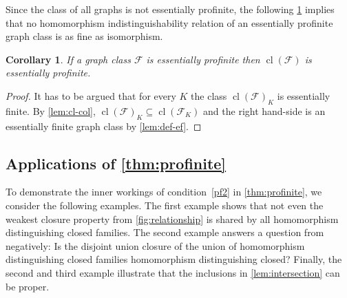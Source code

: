 \documentclass[3p,final]{elsarticle}
\DeclareMathOperator{\cl}{cl}
\newtheorem{corollary}[theorem]{Corollary}
\begin{document}
	Since the class of all graphs is not essentially profinite,
the following \cref{lem:def-epf} implies that no homomorphism indistinguishability relation of an essentially profinite graph class is as fine as isomorphism.

\begin{corollary} \label{lem:def-epf}
	If a graph class $\mathcal{F}$ is essentially profinite then $\cl(\mathcal{F})$ is essentially profinite.
\end{corollary}
\begin{proof}
	It has to be argued that for every $K$ the class $\cl(\mathcal{F})_K$ is essentially finite. By \cref{lem:cl-col}, $\cl(\mathcal{F})_K \subseteq \cl(\mathcal{F}_K)$ and the right hand-side is an essentially finite graph class by \cref{lem:def-ef}.
\end{proof}
	
	\subsection{Applications of \cref{thm:profinite}}
	
	To demonstrate the inner workings of condition~\cref{pf2} in \cref{thm:profinite}, we consider the following examples.
	The first example shows that not even the weakest closure property from \cref{fig:relationship} is shared by all homomorphism distinguishing closed families.
	The second example answers a question from \cite[p.\@~29]{roberson_oddomorphisms_2022} negatively: Is the disjoint union closure of the union of homomorphism distinguishing closed families homomorphism distinguishing closed?
	Finally, the second and third example illustrate that the inclusions in \cref{lem:intersection} can be proper.
	
\end{document}
